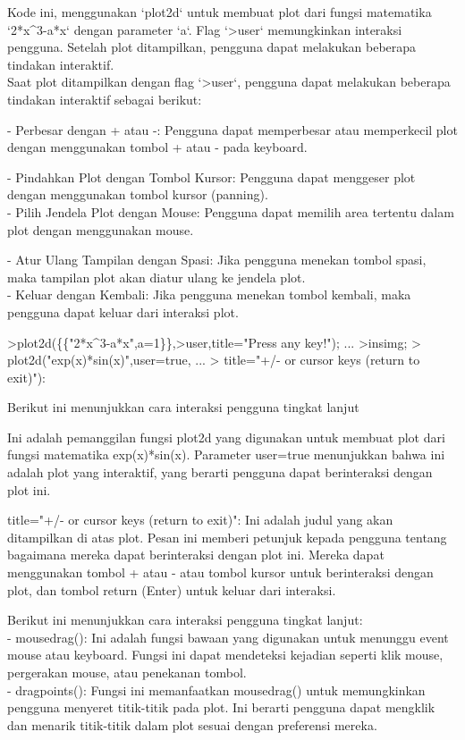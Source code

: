 \documentclass[a4paper,10pt]{article}
\begin{document}
\begin{eulernotebook}
\begin{eulercomment}
\begin{eulercomment}
\begin{eulercomment}
Kode ini, menggunakan `plot2d` untuk membuat plot dari fungsi
matematika `2*x\textasciicircum{}3-a*x` dengan parameter `a`. Flag `\textgreater{}user` memungkinkan
interaksi pengguna. Setelah plot ditampilkan, pengguna dapat melakukan
beberapa tindakan interaktif.\\
Saat plot ditampilkan dengan flag `\textgreater{}user`, pengguna dapat melakukan
beberapa tindakan interaktif sebagai berikut:

- Perbesar dengan + atau -: Pengguna dapat memperbesar atau
memperkecil plot dengan menggunakan tombol + atau - pada keyboard.

- Pindahkan Plot dengan Tombol Kursor: Pengguna dapat menggeser plot
dengan menggunakan tombol kursor (panning).\\
- Pilih Jendela Plot dengan Mouse: Pengguna dapat memilih area
tertentu dalam plot dengan menggunakan mouse.

- Atur Ulang Tampilan dengan Spasi: Jika pengguna menekan tombol
spasi, maka tampilan plot akan diatur ulang ke jendela plot.\\
- Keluar dengan Kembali: Jika pengguna menekan tombol kembali, maka
pengguna dapat keluar dari interaksi plot.
\end{eulercomment}
\begin{eulerprompt}
>plot2d(\{\{"2*x^3-a*x",a=1\}\},>user,title="Press any key!"); ...
>insimg;  
> plot2d("exp(x)*sin(x)",user=true, ...
>  title="+/- or cursor keys (return to exit)"):
\end{eulerprompt}
\begin{eulercomment}
Berikut ini menunjukkan cara interaksi pengguna tingkat lanjut

Ini adalah pemanggilan fungsi plot2d yang digunakan untuk membuat plot
dari fungsi matematika exp(x)*sin(x). Parameter user=true menunjukkan
bahwa ini adalah plot yang interaktif, yang berarti pengguna dapat
berinteraksi dengan plot ini.

title="+/- or cursor keys (return to exit)": Ini adalah judul yang
akan ditampilkan di atas plot. Pesan ini memberi petunjuk kepada
pengguna tentang bagaimana mereka dapat berinteraksi dengan plot ini.
Mereka dapat menggunakan tombol + atau - atau tombol kursor untuk
berinteraksi dengan plot, dan tombol return (Enter) untuk keluar dari
interaksi.

Berikut ini menunjukkan cara interaksi pengguna tingkat lanjut:\\
- mousedrag(): Ini adalah fungsi bawaan yang digunakan untuk menunggu
event mouse atau keyboard. Fungsi ini dapat mendeteksi kejadian
seperti klik mouse, pergerakan mouse, atau penekanan tombol.\\
- dragpoints(): Fungsi ini memanfaatkan mousedrag() untuk memungkinkan
pengguna menyeret titik-titik pada plot. Ini berarti pengguna dapat
mengklik dan menarik titik-titik dalam plot sesuai dengan preferensi
mereka.


\end{eulercomment}
\end{eulercomment}
\end{eulercomment}
\end{eulernotebook}
\end{document}
